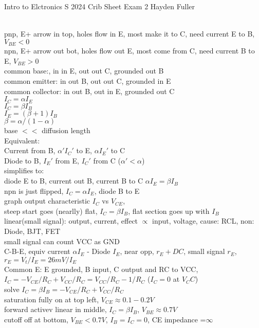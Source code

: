 \documentclass{article}
\begin{document}
Intro to Elctronics S 2024 Crib Sheet Exam 2 Hayden Fuller\begin{large}
\\pnp, E+ arrow in top, holes flow in E, most make it to C, need current E to B, $V_{BE}<0$
\\npn, E+ arrow out bot, holes flow out E, most come from C, need current B to E, $V_{BE}>0$
\\common base:, in in E, out out C, grounded out B
\\common emitter: in out B, out out C, grounded in E
\\common collector: in out B, out in E, grounded out C
\\$I_C=\alpha I_E$
\\$I_C=\beta I_B$
\\$I_E=(\beta+1)I_B$
\\$\beta = \alpha/(1-\alpha)$
\\base $<<$ diffusion length
\\Equivalent:
\\Current from B, $\alpha 'I_C'$ to E, $\alpha I_E'$ to C
\\Diode to B, $I_E '$ from E,  $I_C '$ from C  ($\alpha ' < \alpha$)
\\simplifies to:
\\diode E to B, current out B, current B to C $\alpha I_E=\beta I_B$
\\npn is just flipped, $I_C=\alpha I_E$, diode B to E
\\graph output characteristic $I_C$ vs $V_{CE}$, 
\\steep start goes (nearlly) flat, $I_C=\beta I_B$, flat section goes up with $I_B$
\\linear(small signal): output, current, effect $\propto$ input, voltage, cause: RCL, non: Diode, BJT, FET
\\small signal can count VCC as GND
\\C-B-E, equiv current $\alpha I_E$ - Diode $I_E$, near opp, $r_E+DC$, small signal $r_E$, $r_E=V_t/I_E=26mV/I_E$
\\Common E: E grounded, B input, C output and RC to VCC, 
\\$I_C=-V_{CE}/R_C + V_{CC}/R_C=V_{CC}/R_C-1/R_C$ ($I_C=0$ at $V_CC$)
\\solve $I_C=\beta I_B=-V_{CE}/R_C + V_{CC}/R_C$
\\saturation fully on at top left, $V_{CE}\approx 0.1 - 0.2V$
\\forward activev linear in middle, $I_C=\beta I_B$, $V_{BE}\approx 0.7V$
\\cutoff off at bottom, $V_{BE}<0.7V$, $I_B=I_C=0$, CE impedance =$\infty$

\end{large}
\end{document}
